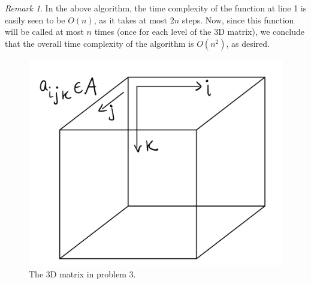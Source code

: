 \documentclass[12pt]{article}
\theoremstyle{definition}
\theoremstyle{remark}
\newtheorem*{remark}{Remark}
\begin{document}
\begin{enumerate}
\begin{enumerate}
\begin{algorithm}
    
  \end{algorithm}
  \begin{remark} 
    In the above algorithm, the time complexity of the function at line 1 is easily seen to be $O(n)$, as it takes at most $2n$ steps. Now, since this function will be called at most $n$ times (once for each level of the 3D matrix), we conclude that the overall time complexity of the algorithm is $O(n^2)$, as desired. 
\end{remark}

\newpage 
\begin{figure}
\label{matrix}
    \centering
    \includegraphics[scale=0.20]{3dmatrix.jpg}
    \caption{The 3D matrix in problem 3.}
\end{figure}

\end{enumerate}
\end{enumerate}
\end{document}
